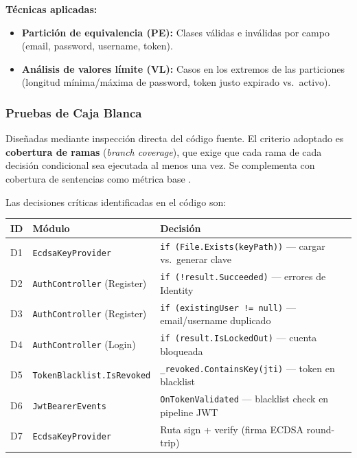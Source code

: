 \documentclass[11pt,a4paper]{article}
\begin{document}
\textbf{Técnicas aplicadas:}
\begin{itemize}[itemsep=2pt]
    \item \textbf{Partición de equivalencia (PE):} Clases válidas e inválidas por campo (email, password, username, token).
    \item \textbf{Análisis de valores límite (VL):} Casos en los extremos de las particiones (longitud mínima/máxima de password, token justo expirado vs.\ activo).
\end{itemize}

\subsubsection{Pruebas de Caja Blanca}

Diseñadas mediante inspección directa del código fuente. El criterio adoptado es \textbf{cobertura de ramas} (\textit{branch coverage}), que exige que cada rama de cada decisión condicional sea ejecutada al menos una vez. Se complementa con cobertura de sentencias como métrica base \cite{zhu1997software}.

Las decisiones críticas identificadas en el código son:

\begin{center}
\renewcommand{\arraystretch}{1.3}
\begin{tabular}{|p{0.7cm}|p{3.8cm}|p{8cm}|}
\hline
\rowcolor{headerblue}\color{white}\textbf{ID} & \color{white}\textbf{Módulo} & \color{white}\textbf{Decisión} \\
\hline
D1 & \texttt{EcdsaKeyProvider} & \texttt{if (File.Exists(keyPath))} — cargar vs.\ generar clave \\
\hline
\rowcolor{rowgray}
D2 & \texttt{AuthController} (Register) & \texttt{if (!result.Succeeded)} — errores de Identity \\
\hline
D3 & \texttt{AuthController} (Register) & \texttt{if (existingUser != null)} — email/username duplicado \\
\hline
\rowcolor{rowgray}
D4 & \texttt{AuthController} (Login) & \texttt{if (result.IsLockedOut)} — cuenta bloqueada \\
\hline
D5 & \texttt{TokenBlacklist.IsRevoked} & \texttt{\_revoked.ContainsKey(jti)} — token en blacklist \\
\hline
\rowcolor{rowgray}
D6 & \texttt{JwtBearerEvents} & \texttt{OnTokenValidated} — blacklist check en pipeline JWT \\
\hline
D7 & \texttt{EcdsaKeyProvider} & Ruta sign + verify (firma ECDSA round-trip) \\
\hline
\end{tabular}
\end{center}
\end{document}

